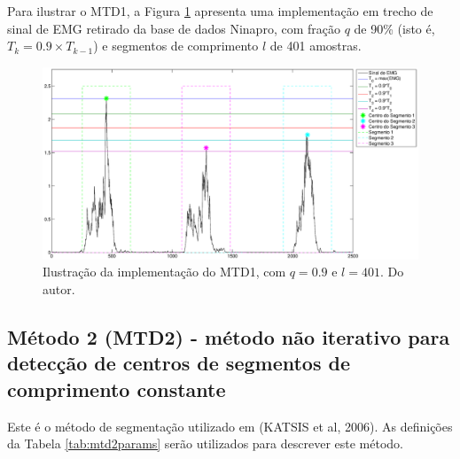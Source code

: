 \documentclass[
	12pt,				%
	openright,			%
	oneside,
	a4paper,			%
	english,			%
	francais,			%
	spanish,			%
	brazil				%
	]{abntex2}
\begin{document}
	Para ilustrar o MTD1, a Figura \ref{fig:mtd1example} apresenta uma implementação em trecho de sinal de EMG retirado da base de dados Ninapro, com fração $q$ de 90\% (isto é, $T_k = 0.9\times T_{k-1}$) e segmentos de comprimento $l$ de 401 amostras.
 
\begin{figure}
\centering
\includegraphics[width=\linewidth]{./img/mtd1example.eps}
\caption{Ilustração da implementação do MTD1, com $q = 0.9$ e $l = 401$. Do autor.}
\label{fig:mtd1example}
\end{figure}
 
\subsection{Método 2 (MTD2) - método não iterativo para detecção de centros de segmentos de comprimento constante}
	Este é o método de segmentação utilizado em (KATSIS et al, 2006). As definições da Tabela \ref{tab:mtd2params} serão utilizados para descrever este método. 
	
\begin{table}[htb]
\end{table}
	
\end{document}
